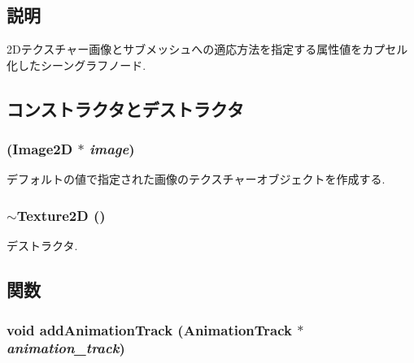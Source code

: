 \subsection{説明}
2Dテクスチャー画像とサブメッシュへの適応方法を指定する属性値をカプセル化したシーングラフノード. 

\subsection{コンストラクタとデストラクタ}
\hypertarget{classm3g_1_1Texture2D_7a8d6431e41022e29ac936afc5e97b8e}{
\subsubsection[{Texture2D}]{ ({\bf Image2D} $\ast$ {\em image})}}
\label{classm3g_1_1Texture2D_7a8d6431e41022e29ac936afc5e97b8e}


デフォルトの値で指定された画像のテクスチャーオブジェクトを作成する. \hypertarget{classm3g_1_1Texture2D_060332aea614a81a914cd2e55f1794df}{
\subsubsection[{$\sim$Texture2D}]{\setlength{\rightskip}{0pt plus 5cm}$\sim${\bf Texture2D} ()}}
\label{classm3g_1_1Texture2D_060332aea614a81a914cd2e55f1794df}


デストラクタ. 

\subsection{関数}
\hypertarget{classm3g_1_1Texture2D_415c0b110f95410ded9b85e5d99a496b}{
\subsubsection[{addAnimationTrack}]{\setlength{\rightskip}{0pt plus 5cm}void addAnimationTrack ({\bf AnimationTrack} $\ast$ {\em animation\_\-track})}}
\label{classm3g_1_1Texture2D_415c0b110f95410ded9b85e5d99a496b}


